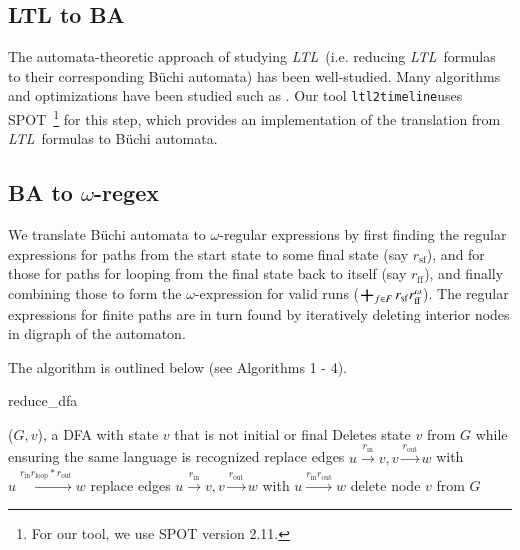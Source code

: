 \documentclass[preprint,12pt]{elsarticle}
\theoremstyle{definition}
\theoremstyle{remark}
\DeclareMathOperator*{\bigplus}{\scalerel*{+}{\sum}}
\newcommand{\ltl}{\textit{LTL}}
\newcommand{\Buchi}{B\"{u}chi }
\newcommand{\tool}{\hspace{0.1cm}\texttt{ltl2timeline}\hspace{0.1cm}}
\begin{document}
\subsection{LTL to BA} \label{ltl2aut}
The automata-theoretic approach \cite{ORBi-a8d60ab6-1101-4434-9511-c01ea4e5a15b} of studying \ltl\ (i.e. reducing \ltl\ formulas to their corresponding \Buchi automata) has been well-studied. Many algorithms and optimizations have been studied such as \cite{DGV99, F03}. Our tool \tool uses SPOT~\cite{Dur22}\footnote{For our tool, we use SPOT version 2.11.} for this step, which provides an implementation of the translation from \ltl\ formulas to \Buchi automata.

\subsection{BA to $\omega$-regex} \label{aut2regex}
We translate \Buchi automata to $\omega$-regular expressions by first finding the regular expressions for paths from the start state to some final state (say $r_\mathrm{sf}$), and for those for paths for looping from the final state back to itself (say $r_\mathrm{ff}$), and finally combining those to form the $\omega$-expression for valid runs ($\bigplus_{f\in F} r_\mathrm{sf}r_\mathrm{ff}^\omega$). The regular expressions for finite paths are in turn found by iteratively deleting interior nodes in digraph of the automaton.

The algorithm is outlined below (see Algorithms 1 - 4). %

\begin{algorithm}[h!]
    \caption{reduce\_dfa}
    \begin{algorithmic}
        \Require ($G, v$), a DFA with state $v$ that is not initial or final
        \Ensure Deletes state $v$ from $G$ while ensuring the same language is recognized
                \State replace edges $u\xrightarrow{r_\mathrm{in}} v, v \xrightarrow{r_\mathrm{out}} w$ with $u \xrightarrow{r_\mathrm{in} r_\mathrm{loop}* r_\mathrm{out}} w$
            \Else
                \State replace edges $u\xrightarrow{r_\mathrm{in}} v, v \xrightarrow{r_\mathrm{out}} w$ with $u \xrightarrow{r_\mathrm{in}  r_\mathrm{out}} w$
            \EndIf
        \EndFor
	\State delete node $v$ from $G$
    \end{algorithmic}
\end{algorithm}
\end{document}
